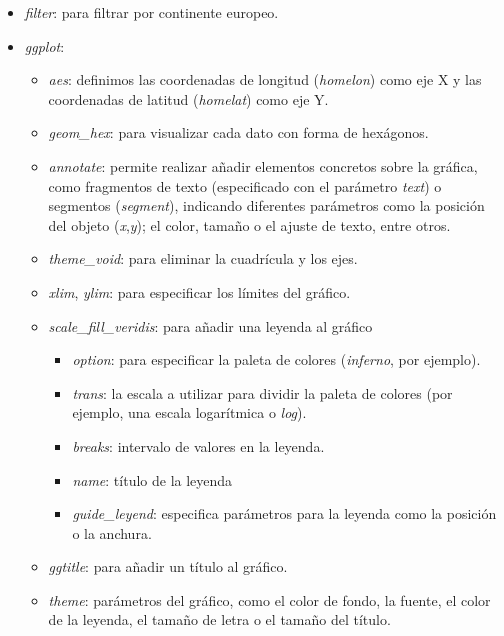 \documentclass [a4paper] {article}
\begin{document}
\begin{itemize}
  \item \textit{filter}: para filtrar por continente europeo.
  \item \textit{ggplot}:
    \begin{itemize}
      \item \textit{aes}: definimos las coordenadas de longitud (\textit{homelon}) como eje X y las coordenadas de latitud (\textit{homelat}) como eje Y.
      \item \textit{geom\_hex}: para visualizar cada dato con forma de hexágonos.
      \item \textit{annotate}: permite realizar añadir elementos concretos sobre la gráfica, como fragmentos de texto (especificado con el parámetro \textit{text}) o segmentos (\textit{segment}), indicando diferentes parámetros como la posición del objeto (\textit{x},\textit{y}); el color, tamaño o el ajuste de texto, entre otros.
      \item \textit{theme\_void}: para eliminar la cuadrícula y los ejes.
      \item \textit{xlim}, \textit{ylim}: para especificar los límites del gráfico.
      \item \textit{scale\_fill\_veridis}: para añadir una leyenda al gráfico
        \begin{itemize}
          \item \textit{option}: para especificar la paleta de colores (\textit{inferno}, por ejemplo).
          \item \textit{trans}: la escala a utilizar para dividir la paleta de colores (por ejemplo, una escala logarítmica o \textit{log}).
          \item \textit{breaks}: intervalo de valores en la leyenda.
          \item \textit{name}: título de la leyenda
          \item \textit{guide\_leyend}: especifica parámetros para la leyenda como la posición o la anchura.
        \end{itemize}
      \item \textit{ggtitle}: para añadir un título al gráfico. 
      \item \textit{theme}: parámetros del gráfico, como el color de fondo, la fuente, el color de la leyenda, el tamaño de letra o el tamaño del título.
    \end{itemize}
\end{itemize}
\end{document}
